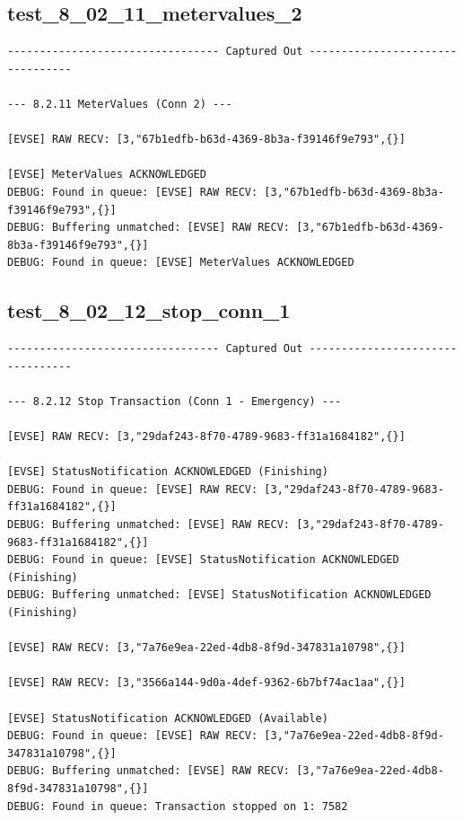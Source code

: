 \documentclass{article}
\begin{document}
\subsection*{test\_8\_02\_11\_metervalues\_2}
\begin{lstlisting}
--------------------------------- Captured Out ---------------------------------

--- 8.2.11 MeterValues (Conn 2) ---

[EVSE] RAW RECV: [3,"67b1edfb-b63d-4369-8b3a-f39146f9e793",{}]

[EVSE] MeterValues ACKNOWLEDGED
DEBUG: Found in queue: [EVSE] RAW RECV: [3,"67b1edfb-b63d-4369-8b3a-f39146f9e793",{}]
DEBUG: Buffering unmatched: [EVSE] RAW RECV: [3,"67b1edfb-b63d-4369-8b3a-f39146f9e793",{}]
DEBUG: Found in queue: [EVSE] MeterValues ACKNOWLEDGED
\end{lstlisting}
\subsection*{test\_8\_02\_12\_stop\_conn\_1}
\begin{lstlisting}
--------------------------------- Captured Out ---------------------------------

--- 8.2.12 Stop Transaction (Conn 1 - Emergency) ---

[EVSE] RAW RECV: [3,"29daf243-8f70-4789-9683-ff31a1684182",{}]

[EVSE] StatusNotification ACKNOWLEDGED (Finishing)
DEBUG: Found in queue: [EVSE] RAW RECV: [3,"29daf243-8f70-4789-9683-ff31a1684182",{}]
DEBUG: Buffering unmatched: [EVSE] RAW RECV: [3,"29daf243-8f70-4789-9683-ff31a1684182",{}]
DEBUG: Found in queue: [EVSE] StatusNotification ACKNOWLEDGED (Finishing)
DEBUG: Buffering unmatched: [EVSE] StatusNotification ACKNOWLEDGED (Finishing)

[EVSE] RAW RECV: [3,"7a76e9ea-22ed-4db8-8f9d-347831a10798",{}]

[EVSE] RAW RECV: [3,"3566a144-9d0a-4def-9362-6b7bf74ac1aa",{}]

[EVSE] StatusNotification ACKNOWLEDGED (Available)
DEBUG: Found in queue: [EVSE] RAW RECV: [3,"7a76e9ea-22ed-4db8-8f9d-347831a10798",{}]
DEBUG: Buffering unmatched: [EVSE] RAW RECV: [3,"7a76e9ea-22ed-4db8-8f9d-347831a10798",{}]
DEBUG: Found in queue: Transaction stopped on 1: 7582
\end{lstlisting}
\end{document}
